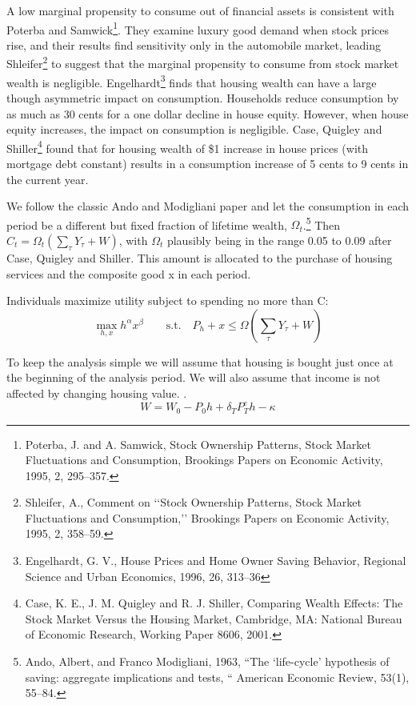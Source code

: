 A low marginal propensity to consume out of financial assets is consistent with Poterba and Samwick\footnote{Poterba, J. and A. Samwick, Stock Ownership Patterns, Stock Market Fluctuations and Consumption, Brookings Papers on Economic Activity, 1995, 2, 295–357.}. They examine luxury good demand when stock prices rise, and their results find sensitivity only in the automobile market, leading Shleifer\footnote{Shleifer, A., Comment on ‘‘Stock Ownership Patterns, Stock Market Fluctuations and Consumption,’’ Brookings Papers on Economic Activity, 1995, 2, 358–59.} to suggest that the marginal propensity to consume from stock market wealth is negligible. Engelhardt\footnote{Engelhardt, G. V., House Prices and Home Owner Saving Behavior, Regional Science and Urban Economics, 1996, 26, 313–36} finds that housing wealth can have a large though asymmetric impact on consumption. Households reduce consumption by as much as 30 cents for a one dollar decline in house equity. However, when house equity increases, the impact on consumption is negligible. Case, Quigley and Shiller\footnote{Case, K. E., J. M. Quigley and R. J. Shiller, Comparing Wealth Effects: The Stock Market Versus the Housing Market, Cambridge, MA: National Bureau of Economic Research, Working Paper 8606, 2001.} found that for housing wealth of \$1 increase in house prices (with mortgage debt constant) results in a consumption increase of 5 cents to 9 cents in the current year.

We follow the classic  Ando and Modigliani paper and let the consumption in each period be a different but fixed fraction of lifetime wealth, $\Omega_t$.\footnote{Ando, Albert, and Franco Modigliani, 1963, “The ‘life-cycle’ hypothesis of saving: aggregate implications and tests, “ American Economic Review, 53(1), 55–84. }  Then $C_t=\Omega_t(\sum_{\tau}Y_{\tau}+W)$, with $\Omega_t$ plausibly being in the range 0.05 to 0.09 after Case, Quigley and Shiller. This amount is allocated to the purchase of housing services and the composite good x in each period. 

Individuals maximize utility  subject to spending  no more than C:
\[\displaystyle\max_{h,x}h^{\alpha}x^{\beta}\quad\quad \textrm{s.t.} \quad P_h+x \leq \Omega(\sum_{\tau}Y_{\tau}+W)\]

To keep the analysis simple we will assume that  housing is bought just once at the beginning of the analysis period. We will also assume that income is not affected by changing housing value.  .  
\[W= W_0 -P_0h+\delta_TP^e_Th-\kappa \]

